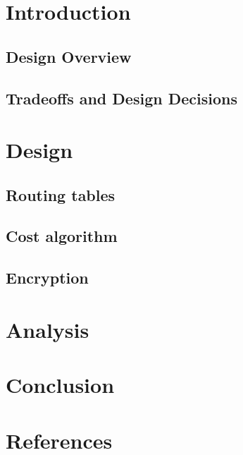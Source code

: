 \documentclass[letterpaper]{article}
\begin{document}
\section{Introduction}

\subsection{Design Overview}

\subsection{Tradeoffs and Design Decisions}

\section{Design}

\subsection{Routing tables}

\subsection{Cost algorithm}

\subsection{Encryption}

\section{Analysis}

\section{Conclusion}

\section{References}
\end{document}
